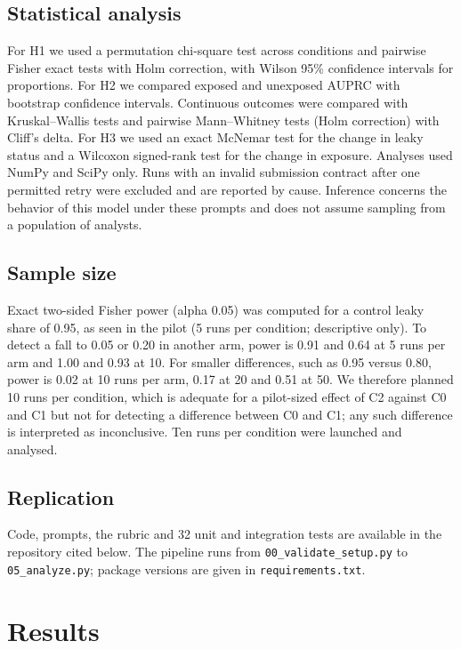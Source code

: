 \documentclass[11pt,a4paper]{article}
\begin{document}
\subsection*{Statistical analysis}
For H1 we used a permutation chi-square test across conditions and pairwise Fisher exact tests with Holm correction, with Wilson 95\% confidence intervals for proportions. For H2 we compared exposed and unexposed AUPRC with bootstrap confidence intervals. Continuous outcomes were compared with Kruskal--Wallis tests and pairwise Mann--Whitney tests (Holm correction) with Cliff's delta. For H3 we used an exact McNemar test for the change in leaky status and a Wilcoxon signed-rank test for the change in exposure. Analyses used NumPy and SciPy only. Runs with an invalid submission contract after one permitted retry were excluded and are reported by cause. Inference concerns the behavior of this model under these prompts and does not assume sampling from a population of analysts.

\subsection*{Sample size}
Exact two-sided Fisher power (alpha 0.05) was computed for a control leaky share of 0.95, as seen in the pilot (5 runs per condition; descriptive only). To detect a fall to 0.05 or 0.20 in another arm, power is 0.91 and 0.64 at 5 runs per arm and 1.00 and 0.93 at 10. For smaller differences, such as 0.95 versus 0.80, power is 0.02 at 10 runs per arm, 0.17 at 20 and 0.51 at 50. We therefore planned 10 runs per condition, which is adequate for a pilot-sized effect of C2 against C0 and C1 but not for detecting a difference between C0 and C1; any such difference is interpreted as inconclusive. Ten runs per condition were launched and analysed.

\subsection*{Replication}
Code, prompts, the rubric and 32 unit and integration tests are available in the repository cited below. The pipeline runs from \texttt{00\_validate\_setup.py} to \texttt{05\_analyze.py}; package versions are given in \texttt{requirements.txt}.

\section*{Results}
\end{document}
